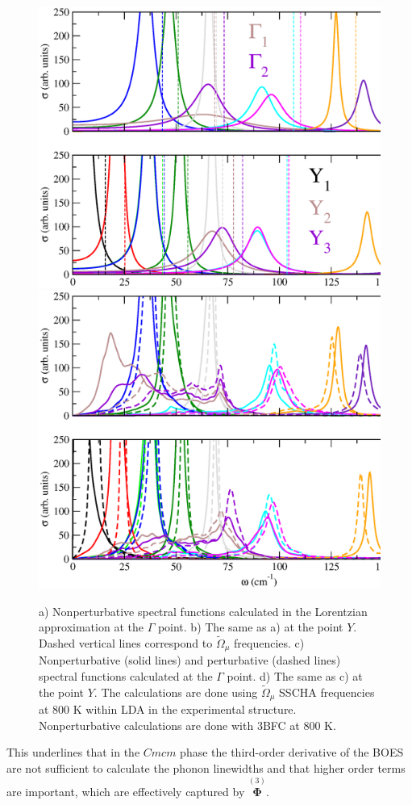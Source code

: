 \begin{figure}[th]
\begin{center}
\includegraphics[width=0.75\linewidth]{Figures/spectrum-lorentzian-snse.eps}
\includegraphics[width=0.75\linewidth]{Figures/spf-p-np-snse.eps}
\caption[Perturbative and nonperturbative spectral functions in SnSe.]{a) Nonperturbative spectral functions calculated in the Lorentzian approximation at the $\Gamma$ point. b) The same as a) at the point
$Y$. Dashed vertical lines correspond to $\tilde{\Omega}_{\mu}$ frequencies. c) Nonperturbative (solid lines) and perturbative (dashed lines)
spectral functions calculated at the $\Gamma$ point. d) The same as c) at the point $Y$. The calculations are done using $\tilde{\Omega}_{\mu}$
SSCHA frequencies at $800$ K within LDA in the experimental structure. Nonperturbative calculations are done with 3BFC at $800$ K.}
\label{spf-p-np}
\end{center}
\end{figure}
This underlines that in the $Cmcm$ phase the third-order derivative of the BOES are not sufficient to calculate the phonon linewidths and that higher order terms are important, which are effectively 
captured by $\overset{(3)}{\boldsymbol{\Phi}}$. \\

